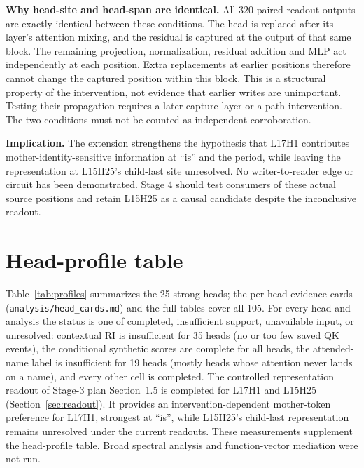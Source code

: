\documentclass[11pt,a4paper]{article}
\begin{document}
\textbf{Why head-site and head-span are identical.} All 320 paired readout outputs
are exactly identical between these conditions. The head is replaced after its
layer's attention mixing, and the residual is captured at the output of that same
block. The remaining projection, normalization, residual addition and MLP act
independently at each position. Extra replacements at earlier positions therefore
cannot change the captured position within this block. This is a structural property
of the intervention, not evidence that earlier writes are unimportant. Testing their
propagation requires a later capture layer or a path intervention. The two conditions
must not be counted as independent corroboration.

\textbf{Implication.} The extension strengthens the hypothesis that L17H1 contributes
mother-identity-sensitive information at ``is'' and the period, while leaving the
representation at L15H25's child-last site unresolved. No writer-to-reader edge or
circuit has been demonstrated. Stage 4 should test consumers of these actual source
positions and retain L15H25 as a causal candidate despite the inconclusive readout.


\section{Head-profile table}
\label{sec:cards}


Table~\ref{tab:profiles} summarizes the 25 strong heads; the per-head evidence cards
(\texttt{analysis/head\_cards.md}) and the full tables cover all 105. For every head
and analysis the status is one of completed, insufficient support, unavailable input,
or unresolved: contextual RI is insufficient for 35 heads (no or too few saved QK
events), the conditional synthetic scores are complete for all heads, the
attended-name label is insufficient for 19 heads (mostly heads whose attention never
lands on a name), and every other cell is completed.
The controlled representation readout of Stage-3 plan Section~1.5 is completed
for L17H1 and L15H25 (Section~\ref{sec:readout}). It provides an intervention-dependent
mother-token preference for L17H1, strongest at ``is'', while L15H25's child-last
representation remains unresolved under the current readouts. These measurements
supplement the head-profile table. Broad spectral analysis and function-vector
mediation were not run.
\end{document}
